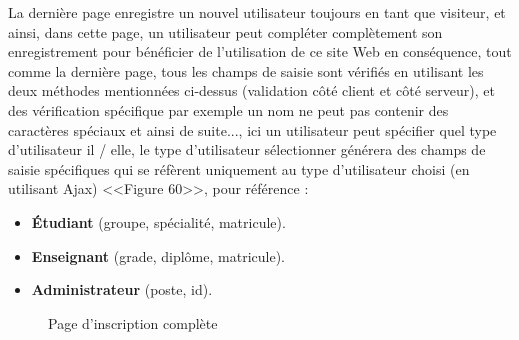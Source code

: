 \documentclass[12pt]{report}
\begin{document}
La dernière page enregistre un nouvel utilisateur toujours en tant que visiteur, et ainsi, dans cette page, un utilisateur peut compléter complètement son enregistrement pour bénéficier de l'utilisation de ce site Web en conséquence, tout comme la dernière page, tous les champs de saisie sont vérifiés en utilisant les deux méthodes mentionnées ci-dessus (validation côté client et côté serveur), et des vérification spécifique par exemple un nom ne peut pas contenir des caractères spéciaux et ainsi de suite..., ici un utilisateur peut spécifier quel type d'utilisateur il / elle, le type d'utilisateur sélectionner générera des champs de saisie spécifiques qui se réfèrent uniquement au type d'utilisateur choisi (en utilisant Ajax) <<Figure 60>>, pour référence :

\begin{itemize}
  \item \textbf{Étudiant} (groupe, spécialité, matricule).
  \item \textbf{Enseignant} (grade, diplôme, matricule).
  \item \textbf{Administrateur} (poste, id).
\end{itemize}

\vspace{0.08in}

\begin{figure}[h]
\centering
  \caption{Page d'inscription complète}
\end{figure}
\end{document}
